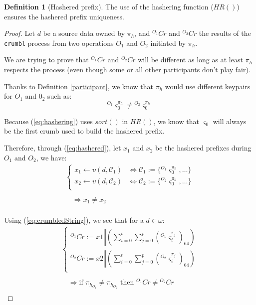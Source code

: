 \documentclass[twoside,twocolumn]{article}
\theoremstyle{definition}
\newtheorem{definition}{Definition}
\theoremstyle{remark}
\begin{document}
\begin{definition}[Hashered prefix]
    The use of the hashering function ($HR()$) ensures the hashered prefix uniqueness.

    \begin{proof}
        Let $d$ be a source data owned by $\pi_{h}$, and ${}^{O_1}Cr$ and ${}^{O_2}Cr$ the results of the \texttt{crumbl} process from two operations 
        $O_1$ and $O_2$ initiated by $\pi_h$.

        We are trying to prove that ${}^{O_1}Cr$ and ${}^{O_2}Cr$ will be different as long as at least $\pi_{h}$ respects the process (even though 
        some or all other participants don't play fair).

        Thanks to Definition \ref{participant}, we know that $\pi_h$ would use different keypairs for $O_1$ and $0_2$ such as:$$
            {}^{O_1}\varsigma_0^{\pi_h} \neq {}^{O_2}\varsigma_0^{\pi_h}
        $$

        Because (\ref{eq:hashering}) uses $sort()$ in $HR()$, we know that $\varsigma_0$ will always be the first crumb used to build the hashered 
        prefix.
        
        Therefore, through (\ref{eq:hashered}), let $x_1$ and $x_2$ be the hashered prefixes during $O_1$ and $O_2$, we have:$$
        \begin{array}{l}
            \left\{
                \begin{array}{ll}
                    x_1 \gets \upsilon(d, \mathcal{C}_1) &\iff \mathcal{C}_1 := \{ {}^{O_1}\varsigma_0^{\pi_h}, \dots \} \\
                    x_2 \gets \upsilon(d, \mathcal{C}_2) &\iff \mathcal{C}_2 := \{ {}^{O_2}\varsigma_0^{\pi_h}, \dots \} \\
                \end{array}
            \right. \\ \\
            \quad \Rightarrow x_1 \neq x_2 \\
            \end{array}
        $$
        
        Using (\ref{eq:crumbledString}), we see that for a $d \in \omega$:$$
        \begin{array}{l}
            \left\{
                \begin{array}{l}
                    {}^{O_1}Cr := x1 \mathbin\Vert \left( \sum_{i=0}^t \sum_{j=0}^p ({}^{O_1}\varsigma_i^{\pi_j})_{64} \right) \\
                    {}^{O_2}Cr := x2 \mathbin\Vert \left( \sum_{i=0}^t \sum_{j=0}^p ({}^{O_2}\varsigma_i^{\pi_j})_{64} \right) \\
                \end{array}
            \right. \\ \\
            \quad \Rightarrow \textrm{if } \pi_{h_{O_1}} \neq \pi_{h_{O_2}} \textrm{ then } {}^{O_1}Cr \neq {}^{O_2}Cr \\
        \end{array}$$


\end{proof}
\end{definition}
\end{document}

